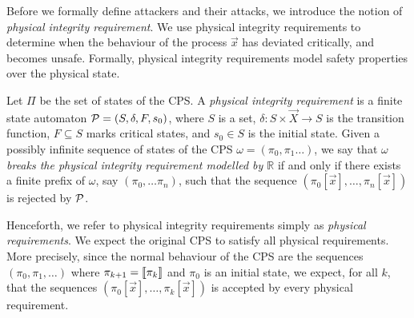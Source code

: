 {%

Before we formally define attackers and their attacks, we introduce the notion of \emph{physical integrity requirement}. We use physical integrity requirements to determine when the behaviour of the process $\vec{x}$ has deviated critically, and becomes unsafe. Formally, physical integrity requirements model safety properties over the physical state.
\begin{definition}
  Let $\Pi$ be the set of states of the CPS. A \emph{physical integrity requirement} is a finite state automaton $\mathcal{P}=(S,\delta,F,s_0)$, where $S$ is a set, $\delta\colon S\times \vec{X}\rightarrow S$ is the transition function, $F\subseteq S$ marks critical states, and $s_0\in S$ is the initial state. Given a possibly infinite sequence of states of the CPS $\omega=(\pi_0,\pi_1 \ldots)$, we say that \emph{$\omega$ breaks the physical integrity requirement modelled by $\mathbb{R}$} if and only if there exists a finite prefix of $\omega$, say $(\pi_0,\ldots\pi_n)$, such that the sequence $(\pi_0[\vec{x}],\ldots, \pi_n[\vec{x}])$ is rejected by $\mathcal{P}$. %
\end{definition}
Henceforth, we refer to physical integrity requirements simply as \emph{physical requirements}. We expect the original CPS to satisfy all physical requirements. More precisely, since the normal behaviour of the CPS are the sequences $(\pi_0, \pi_1, \ldots)$ where $\pi_{k+1}={{\llbracket\pi_k\rrbracket}}$ and $\pi_0$ is an initial state, we expect, for all $k$, that the sequences $(\pi_0[\vec{x}],\ldots,\pi_k[\vec{x}])$ is accepted by every physical requirement.

}
